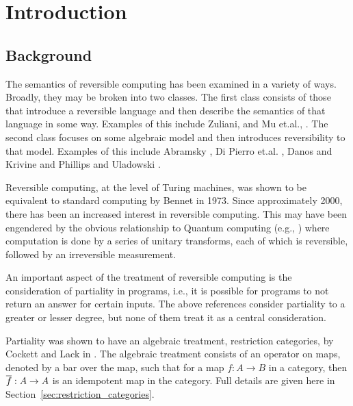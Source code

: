 \chapter{Introduction}
\section{Background}
\label{sec:background}

The semantics of reversible computing has been examined in a variety of ways. Broadly, they may be
broken into two classes. The first class consists of those that introduce a reversible
language and then describe the semantics of that language in some way. Examples of this include
Zuliani, \cite{zuliani01:reversibility} and Mu et.al., \cite{muetal04:injreversible}. The second
class focuses on some algebraic model and then introduces reversibility to that model. Examples of this
include Abramsky \cite{abramsky05:reversible}, Di Pierro et.al. \cite{DiPierro200625}, Danos and
Krivine \cite{danos2004reversible} and Phillips and Uladowski \cite{phillips2006operational}.

Reversible computing, at the level of Turing machines, was shown to be equivalent to standard
computing by Bennet \cite{bennett:1973reverse} in 1973. Since approximately 2000, there has
been an increased interest in reversible computing. This may have been engendered by the obvious relationship
to Quantum computing (e.g., \cite{neilsen2000:QuantumComputationAndInfo}) where computation is done
by a series of unitary transforms, each of which is reversible, followed by an irreversible
measurement.

An important aspect of the treatment of reversible computing is the consideration of partiality in
programs, i.e., it is possible for programs to not return an answer for certain inputs. The above
references consider partiality to a greater or lesser degree, but none of them treat it as a central
consideration.

Partiality was shown to have an algebraic treatment, restriction categories, by Cockett and Lack in
\cite{cockett2002:restcategories1,cockettlack2003:restcategories2,cockettlack2004:restcategories3}. The
algebraic treatment consists of an operator on maps, denoted by a bar over the map, such that for a
map $f:A\to B$ in a category, then $\overline{f}:A\to A$ is an idempotent map in the category. Full
details are given here in Section~\ref{sec:restriction_categories}.


